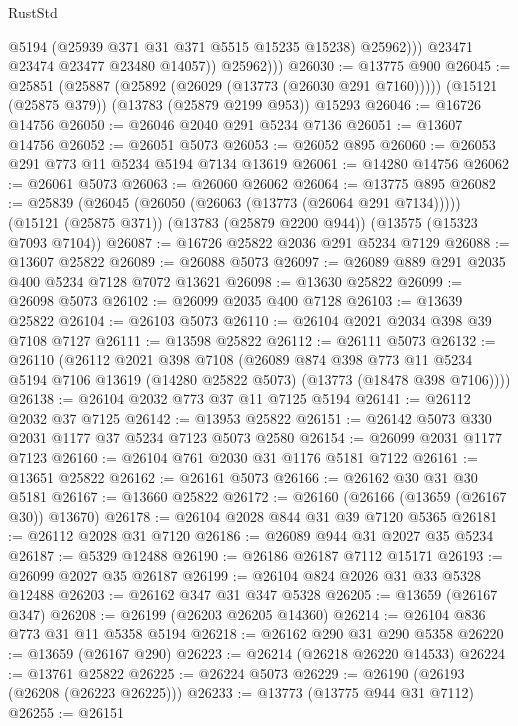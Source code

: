 \begin{lexlean}{RustStd}
\begin{coremodule}
                    @5194
                    (@25939 @371 @31 @371 @5515 @15235 @15238)
                    @25962)))
              @23471
              @23474
              @23477
              @23480
              @14057))
          @25962)))
@26030 := @13775 @900
@26045 := @25851
    (@25887 (@25892 (@26029 (@13773 (@26030 @291 @7160)))))
    (@15121 (@25875 @379))
    (@13783 (@25879 @2199 @953))
    @15293
@26046 := @16726 @14756
@26050 := @26046 @2040 @291 @5234 @7136
@26051 := @13607 @14756
@26052 := @26051 @5073
@26053 := @26052 @895
@26060 := @26053 @291 @773 @11 @5234 @5194 @7134 @13619
@26061 := @14280 @14756
@26062 := @26061 @5073
@26063 := @26060 @26062
@26064 := @13775 @895
@26082 := @25839
    (@26045 (@26050 (@26063 (@13773 (@26064 @291 @7134)))))
    (@15121 (@25875 @371))
    (@13783 (@25879 @2200 @944))
    (@13575 (@15323 @7093 @7104))
@26087 := @16726 @25822 @2036 @291 @5234 @7129
@26088 := @13607 @25822
@26089 := @26088 @5073
@26097 := @26089 @889 @291 @2035 @400 @5234 @7128 @7072 @13621
@26098 := @13630 @25822
@26099 := @26098 @5073
@26102 := @26099 @2035 @400 @7128
@26103 := @13639 @25822
@26104 := @26103 @5073
@26110 := @26104 @2021 @2034 @398 @39 @7108 @7127
@26111 := @13598 @25822
@26112 := @26111 @5073
@26132 := @26110
    (@26112
      @2021
      @398
      @7108
      (@26089
        @874
        @398
        @773
        @11
        @5234
        @5194
        @7106
        @13619
        (@14280 @25822 @5073)
        (@13773 (@18478 @398 @7106))))
@26138 := @26104 @2032 @773 @37 @11 @7125 @5194
@26141 := @26112 @2032 @37 @7125
@26142 := @13953 @25822
@26151 := @26142 @5073 @330 @2031 @1177 @37 @5234 @7123 @5073 @2580
@26154 := @26099 @2031 @1177 @7123
@26160 := @26104 @761 @2030 @31 @1176 @5181 @7122
@26161 := @13651 @25822
@26162 := @26161 @5073
@26166 := @26162 @30 @31 @30 @5181
@26167 := @13660 @25822
@26172 := @26160 (@26166 (@13659 (@26167 @30)) @13670)
@26178 := @26104 @2028 @844 @31 @39 @7120 @5365
@26181 := @26112 @2028 @31 @7120
@26186 := @26089 @944 @31 @2027 @35 @5234
@26187 := @5329 @12488
@26190 := @26186 @26187 @7112 @15171
@26193 := @26099 @2027 @35 @26187
@26199 := @26104 @824 @2026 @31 @33 @5328 @12488
@26203 := @26162 @347 @31 @347 @5328
@26205 := @13659 (@26167 @347)
@26208 := @26199 (@26203 @26205 @14360)
@26214 := @26104 @836 @773 @31 @11 @5358 @5194
@26218 := @26162 @290 @31 @290 @5358
@26220 := @13659 (@26167 @290)
@26223 := @26214 (@26218 @26220 @14533)
@26224 := @13761 @25822
@26225 := @26224 @5073
@26229 := @26190 (@26193 (@26208 (@26223 @26225)))
@26233 := @13773 (@13775 @944 @31 @7112)
@26255 := @26151

\end{coremodule}
\end{lexlean}
